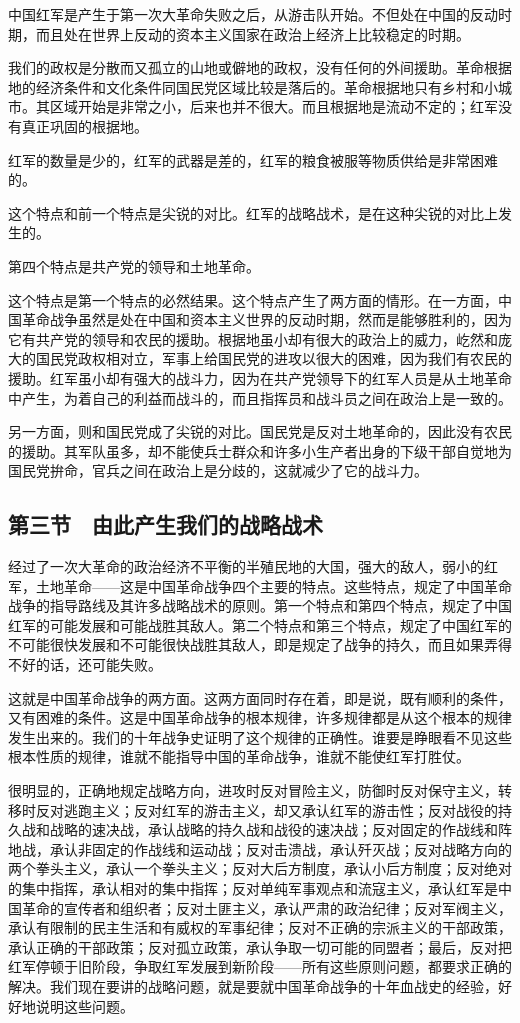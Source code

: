 中国红军是产生于第一次大革命失败之后，从游击队开始。不但处在中国的反动时期，而且处在世界上反动的资本主义国家在政治上经济上比较稳定的时期。

我们的政权是分散而又孤立的山地或僻地的政权，没有任何的外间援助。革命根据地的经济条件和文化条件同国民党区域比较是落后的。革命根据地只有乡村和小城市。其区域开始是非常之小，后来也并不很大。而且根据地是流动不定的；红军没有真正巩固的根据地。

红军的数量是少的，红军的武器是差的，红军的粮食被服等物质供给是非常困难的。

这个特点和前一个特点是尖锐的对比。红军的战略战术，是在这种尖锐的对比上发生的。

第四个特点是共产党的领导和土地革命。

这个特点是第一个特点的必然结果。这个特点产生了两方面的情形。在一方面，中国革命战争虽然是处在中国和资本主义世界的反动时期，然而是能够胜利的，因为它有共产党的领导和农民的援助。根据地虽小却有很大的政治上的威力，屹然和庞大的国民党政权相对立，军事上给国民党的进攻以很大的困难，因为我们有农民的援助。红军虽小却有强大的战斗力，因为在共产党领导下的红军人员是从土地革命中产生，为着自己的利益而战斗的，而且指挥员和战斗员之间在政治上是一致的。

另一方面，则和国民党成了尖锐的对比。国民党是反对土地革命的，因此没有农民的援助。其军队虽多，却不能使兵士群众和许多小生产者出身的下级干部自觉地为国民党拚命，官兵之间在政治上是分歧的，这就减少了它的战斗力。

\subsection{第三节　由此产生我们的战略战术}

经过了一次大革命的政治经济不平衡的半殖民地的大国，强大的敌人，弱小的红军，土地革命——这是中国革命战争四个主要的特点。这些特点，规定了中国革命战争的指导路线及其许多战略战术的原则。第一个特点和第四个特点，规定了中国红军的可能发展和可能战胜其敌人。第二个特点和第三个特点，规定了中国红军的不可能很快发展和不可能很快战胜其敌人，即是规定了战争的持久，而且如果弄得不好的话，还可能失败。

这就是中国革命战争的两方面。这两方面同时存在着，即是说，既有顺利的条件，又有困难的条件。这是中国革命战争的根本规律，许多规律都是从这个根本的规律发生出来的。我们的十年战争史证明了这个规律的正确性。谁要是睁眼看不见这些根本性质的规律，谁就不能指导中国的革命战争，谁就不能使红军打胜仗。

很明显的，正确地规定战略方向，进攻时反对冒险主义，防御时反对保守主义，转移时反对逃跑主义；反对红军的游击主义，却又承认红军的游击性；反对战役的持久战和战略的速决战，承认战略的持久战和战役的速决战；反对固定的作战线和阵地战，承认非固定的作战线和运动战；反对击溃战，承认歼灭战；反对战略方向的两个拳头主义，承认一个拳头主义；反对大后方制度，承认小后方制度；反对绝对的集中指挥，承认相对的集中指挥；反对单纯军事观点和流寇主义，承认红军是中国革命的宣传者和组织者；反对土匪主义，承认严肃的政治纪律；反对军阀主义，承认有限制的民主生活和有威权的军事纪律；反对不正确的宗派主义的干部政策，承认正确的干部政策；反对孤立政策，承认争取一切可能的同盟者；最后，反对把红军停顿于旧阶段，争取红军发展到新阶段——所有这些原则问题，都要求正确的解决。我们现在要讲的战略问题，就是要就中国革命战争的十年血战史的经验，好好地说明这些问题。

